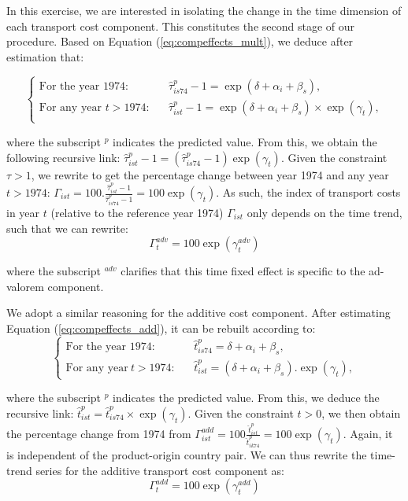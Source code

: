 \documentclass[a4paper,11pt]{article}
\begin{document}
In this exercise, we are interested in isolating the change in the time dimension of each transport cost component. This constitutes the second stage of our procedure. Based on Equation (\ref{eq:compeffects_mult}), we deduce after estimation that:

\[\left\{
  \begin{array}{lcl}
  \text{For the year 1974:} &&  \widehat{\tau}^p_{is74} -1 = \exp(\delta +\alpha_i+\beta_s), \\
  \text{For any year }t> 1974:&& \widehat{\tau}^p_{ist} -1 = \exp(\delta +\alpha_i+\beta_s)\times \exp(\gamma_t), \\
  \end{array}
\right.\]

\noindent where the subscript $^{p}$ indicates the predicted value. From this, we obtain the following recursive link: $\widehat{\tau}^p_{ist} -1 = (\widehat{\tau}^p_{is74}-1)\exp(\gamma_t)$. Given the constraint $\tau>1$, we rewrite to get the percentage change between year 1974 and any year $t>1974$: $\Gamma_{ist} = 100.\frac{\widehat{\tau}^p_{ist}-1}{\widehat{\tau}^p_{is74}-1}  = 100\exp(\gamma_t)$. As such, the index of transport costs in year $t$ (relative to the reference year 1974) $\Gamma_{ist} $  only depends on the time trend, such that we can rewrite:
\begin{equation}
 \Gamma^{adv}_t= 100\exp(\gamma^{adv}_t)  \label{eq:tcadv_compoeffect}
\end{equation}

\noindent where the subscript $^{adv}$ clarifies that this time fixed effect is specific to the ad-valorem component.

We adopt a similar reasoning for the additive cost component. After estimating Equation (\ref{eq:compeffects_add}), it can be rebuilt according to:
\[\left\{
  \begin{array}{lcl}
\text{For the year 1974:}&&\widehat{t}^p_{is74}=  \delta + \alpha_i+ \beta_s, \\
\text{For any year}~t> 1974:&&\widehat{t}^p_{ist}=\left(\delta + \alpha_i+ \beta_s\right).\exp(\gamma_t),
\end{array}
\right.\]

\noindent where the subscript $^{p}$ indicates the predicted value. From this, we deduce the recursive link: $\widehat{t}^p_{ist} = \widehat{t}^p_{is74} \times \exp(\gamma_t)$.
Given the constraint $t>0$, we then obtain the percentage change from 1974 from $\Gamma^{add}_{ist} = 100\frac{\widehat{t}^p_{ist}}{\widehat{t}^p_{ik74}} = 100\exp(\gamma_t)$. Again, it is independent of the product-origin country pair. We can thus rewrite the time-trend series for the additive transport cost component as:
\begin{equation}
\Gamma^{add}_t  = 100\exp(\gamma^{add}_t) \label{eq:tcadd_compoeffect}
\end{equation}
\end{document}
